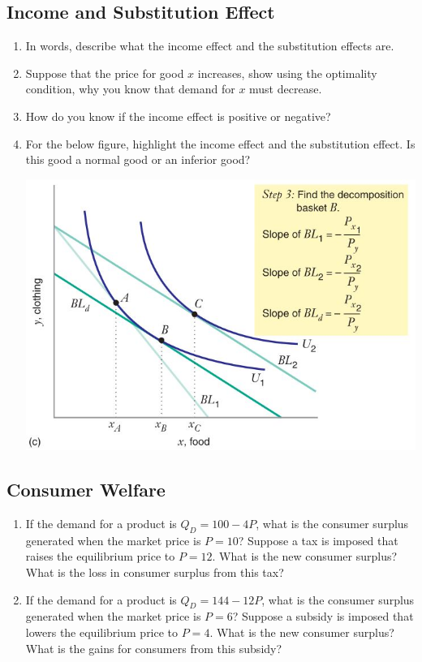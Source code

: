 \documentclass[11pt]{article}
\begin{document}
\subsection*{Income and Substitution Effect}
\begin{enumerate}
  \item In words, describe what the income effect and the substitution effects are.
  
  \item Suppose that the price for good $x$ increases, show using the optimality condition, why you know that demand for $x$ must decrease. 
  
  \item How do you know if the income effect is positive or negative?

  \item For the below figure, highlight the income effect and the substitution effect. Is this good a normal good or an inferior good?
  
  \includegraphics[width=0.6\linewidth]{../Lecture Slides/figures/fig5_6c.JPG}
\end{enumerate}

\subsection*{Consumer Welfare}
\begin{enumerate}
  \item If the demand for a product is $Q_D = 100 - 4P$, what is the consumer surplus generated when the market price is $P = 10$? Suppose a tax is imposed that raises the equilibrium price to $P = 12$. What is the new consumer surplus? What is the loss in consumer surplus from this tax?
  
  \item If the demand for a product is $Q_D = 144 - 12P$, what is the consumer surplus generated when the market price is $P = 6$? Suppose a subsidy is imposed that lowers the equilibrium price to $P = 4$. What is the new consumer surplus? What is the gains for consumers from this subsidy?
\end{enumerate}
\end{document}
